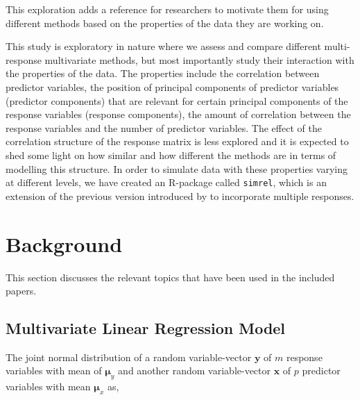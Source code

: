 \documentclass[11pt,twoside,openright,titlepage,
  headinclude,footinclude,BCOR=5mm,
  numbers=noenddot,cleardoublepage=empty,
  tablecaptionabove, dottedtoc,
  bibliography=totoc,paper=a4]{scrreprt}
\begin{document}
This exploration adds a reference for researchers to motivate them for using different methods based on the properties of the data they are working on.

This study is exploratory in nature where we assess and compare different multi-response multivariate methods, but most importantly study their interaction with the properties of the data. The properties include the correlation between predictor variables, the position of principal components of predictor variables (predictor components) that are relevant for certain principal components of the response variables (response components), the amount of correlation between the response variables and the number of predictor variables. The effect of the correlation structure of the response matrix is less explored and it is expected to shed some light on how similar and how different the methods are in terms of modelling this structure. In order to simulate data with these properties varying at different levels, we have created an R-package called \texttt{simrel}, which is an extension of the previous version introduced by \citet{saebo2015simrel} to incorporate multiple responses.

\hypertarget{background}{%
\chapter{Background}\label{background}}

This section discusses the relevant topics that have been used in the included papers.

\hypertarget{multivariate-linear-regression-model}{%
\section{Multivariate Linear Regression Model}\label{multivariate-linear-regression-model}}

The joint normal distribution of a random variable-vector \(\mathbf{y}\) of \(m\) response variables with mean of \(\boldsymbol{\mu}_y\) and another random variable-vector \(\mathbf{x}\) of \(p\) predictor variables with mean \(\boldsymbol{\mu}_x\) as,
\end{document}

